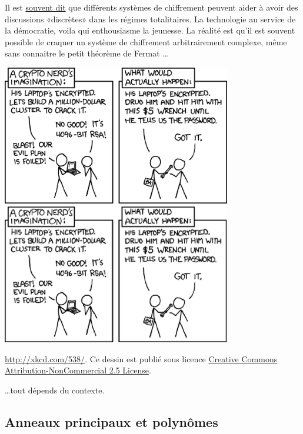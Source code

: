 Il est \href{https://www.torproject.org/about/torusers.html.en#activists}{souvent dit} que différents systèmes de chiffrement peuvent aider à avoir des discussions «discrètes» dans les régimes totalitaires. La technologie au service de la démocratie, voila qui enthousiasme la jeunesse. La réalité est qu'il est souvent possible de craquer un système de chiffrement arbitrairement complexe, même sans connaitre le petit théorème de Fermat \ldots

\begin{center}
        \ifpdf
            \includegraphics[width=10cm]{security.png}
        \else
            \includegraphics[width=10cm]{security.eps}
        \fi

        \url{http://xkcd.com/538/}. Ce dessin est publié sous licence \href{http://creativecommons.org/licenses/by-nc/2.5/}{ Creative Commons Attribution-NonCommercial 2.5 License}.
\end{center}

\noindent \ldots tout dépends du contexte.

\subsection{Anneaux principaux et polynômes}

